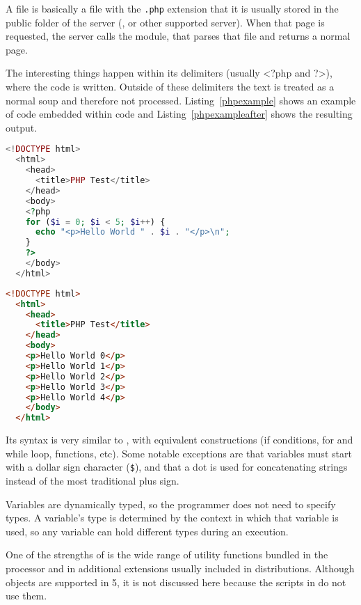 A  file is basically a  file with the \texttt{.php} extension that it is usually stored in the public folder of the server (,  or other supported server).
When that page is requested, the server calls the  module, that parses that file and returns a normal  page.

The interesting things happen within its delimiters
(usually <?php and ?>), where the  code is written.
Outside of these delimiters the text is treated as a normal  soup and therefore not processed.
Listing~\ref{phpexample} shows an example of  code embedded within  code and Listing~\ref{phpexampleafter} shows the resulting  output.

\begin{lstlisting}[float=htbp,label=phpexample,language=php,alsolanguage=html,caption=\idx{PHP} code embedded within \idx{HTML} code]
  <!DOCTYPE html>
  <html>
    <head>
      <title>PHP Test</title>
    </head>
    <body>
    <?php
    for ($i = 0; $i < 5; $i++) {
      echo "<p>Hello World " . $i . "</p>\n";
    }
    ?>
    </body>
  </html>
\end{lstlisting}

\begin{lstlisting}[float=htbp,label=phpexampleafter,language=html,caption=Resulting \idx{HTML} code]
  <!DOCTYPE html>
  <html>
    <head>
      <title>PHP Test</title>
    </head>
    <body>
    <p>Hello World 0</p>
    <p>Hello World 1</p>
    <p>Hello World 2</p>
    <p>Hello World 3</p>
    <p>Hello World 4</p>
    </body>
  </html>
\end{lstlisting}

Its syntax is very similar to , with equivalent constructions (if conditions, for and while loop, functions, etc).
Some notable exceptions are that variables must start with a dollar sign character (\texttt{\$}), and that a dot is used for concatenating strings instead of the most traditional plus sign.

Variables are dynamically typed, so the programmer does not need to specify types. A variable's type is determined by the context in which that variable is used, so any variable can hold different types during an execution.

One of the strengths of  is the wide range of utility functions bundled in the processor and in additional extensions usually included in distributions.
Although objects are supported in  5, it is not discussed here because the scripts in  do not use them.

